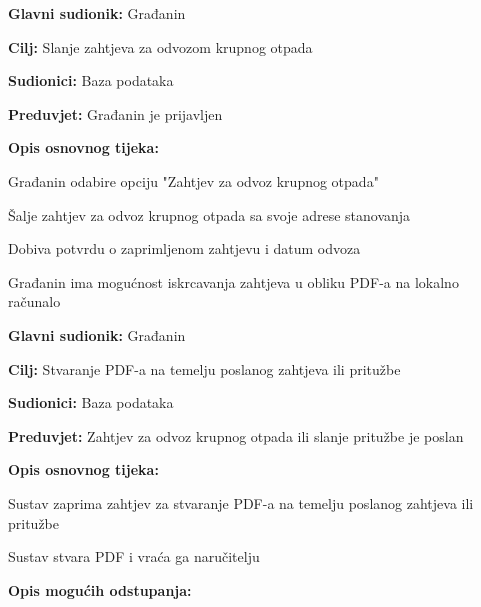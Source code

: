 				\noindent {}
				\begin{packed_item}
					
					\item \textbf{Glavni sudionik: }Građanin
					\item  \textbf{Cilj:} Slanje zahtjeva za odvozom krupnog otpada
					\item  \textbf{Sudionici:} Baza podataka
					\item  \textbf{Preduvjet:} Građanin je prijavljen
					\item  \textbf{Opis osnovnog tijeka:}
					
					\item[] \begin{packed_enum}
						\item Građanin odabire opciju "Zahtjev za odvoz krupnog otpada"
						\item Šalje zahtjev za odvoz krupnog otpada sa svoje adrese stanovanja
						\item Dobiva potvrdu o zaprimljenom zahtjevu i datum odvoza
						\item Građanin ima mogućnost iskrcavanja zahtjeva u obliku PDF-a na lokalno računalo
					\end{packed_enum}
				\end{packed_item}
								
				\noindent \underbar{\textbf{UC9 -Stvaranje PDF-a }}
				\begin{packed_item}
					
					\item \textbf{Glavni sudionik: }Građanin
					\item  \textbf{Cilj:} Stvaranje PDF-a na temelju poslanog zahtjeva ili pritužbe
					\item  \textbf{Sudionici:} Baza podataka
					\item  \textbf{Preduvjet:} Zahtjev za odvoz krupnog otpada ili slanje pritužbe je poslan
					\item  \textbf{Opis osnovnog tijeka:}
					
					\item[] \begin{packed_enum}
						
						\item Sustav zaprima zahtjev za stvaranje PDF-a na temelju poslanog zahtjeva ili pritužbe
						\item Sustav stvara PDF i vraća ga naručitelju
					\end{packed_enum}
					
					\item  \textbf{Opis mogućih odstupanja:}
				\end{packed_item}
			

